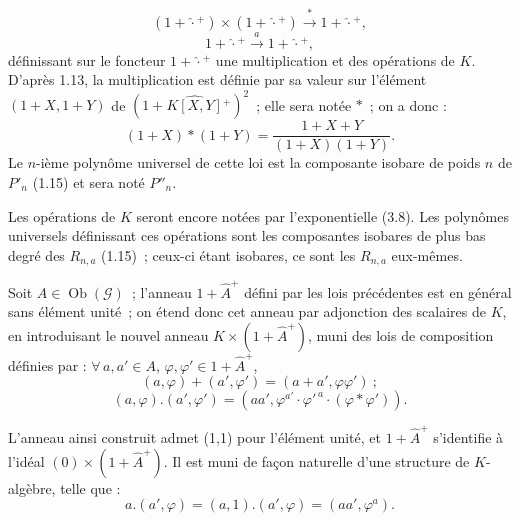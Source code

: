 \[
  (1+\widehat{\cdot}{}^{+})\times(1+\widehat{\cdot}{}^{+})\xrightarrow{\ \ast\ }1+\widehat{\cdot}{}^{+},
\]
\[
  1+\widehat{\cdot}{}^{+}\xrightarrow{\ a\ }1+\widehat{\cdot}{}^{+},
\]
définissant sur le foncteur \(1+\widehat{\cdot}{}^{+}\) une multiplication et des opérations de \(K\). D'après 1.13, la multiplication est définie par sa valeur sur l'élément \((1+X,1+Y)\) de \((1+\widehat{K[X,Y]}{}^{+})^{2}\)~; elle sera notée \(\ast\)~; on a donc :
\begin{equation}\tag{6.1.1}
  (1+X)\ast(1+Y)=\frac{1+X+Y}{(1+X)(1+Y)}.
\end{equation}
Le \(n\)-ième polynôme universel de cette loi est la composante isobare de poids \(n\) de \(P'_n\) (1.15) et sera noté \(P''_n\).

Les opérations de \(K\) seront encore notées par l'exponentielle (3.8). Les polynômes universels définissant ces opérations sont les composantes isobares de plus bas degré des \(R_{n,a}\) (1.15)~; ceux-ci étant isobares, ce sont les \(R_{n,a}\) eux-mêmes.

Soit \(A\in\operatorname{Ob}(\mathcal G)\)~; l'anneau \(1+\widehat A^{+}\) défini par les lois précédentes est en général sans élément unité~; on étend donc cet anneau par adjonction des scalaires de \(K\), en introduisant le nouvel anneau \(K\times(1+\widehat A^{+})\), muni des lois de composition définies par : \(\forall\,a,a'\in A\), \(\varphi,\varphi'\in1+\widehat A^{+}\),
\[
  (a,\varphi)+(a',\varphi')=(a+a',\varphi\varphi')~;
\]
\begin{equation}\tag{6.1.2}
  (a,\varphi).(a',\varphi')=(aa',\varphi^{a'}\cdot{\varphi'}^{\,a}\cdot(\varphi\ast\varphi')).
\end{equation}

L'anneau ainsi construit admet (1,1) pour l'élément unité, et \(1+\widehat A^{+}\) s'identifie à l'idéal \((0)\times(1+\widehat A^{+})\). Il est muni de façon naturelle d'une structure de \(K\)-algèbre, telle que :
\begin{equation}\tag{6.1.3}
  a.(a',\varphi)=(a,1).(a',\varphi)=(aa',\varphi^{a}).
\end{equation}

